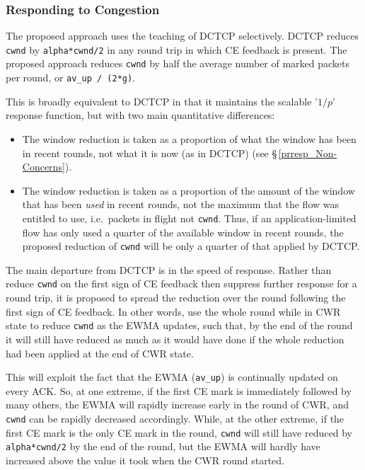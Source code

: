 \subsubsection{Responding to Congestion}\label{prresp_congestion_response}

The proposed approach uses the teaching of DCTCP selectively. DCTCP reduces \texttt{cwnd} by \texttt{alpha*cwnd/2} in any round trip in which CE feedback is present. The proposed approach reduces \texttt{cwnd} by half the average number of marked packets per round, or \texttt{av\_up / (2*g)}. 

This is broadly equivalent to DCTCP in that it maintains the scalable '\(1/p\)' response function, but with two main quantitative differences:
\begin{itemize}[nosep]
	\item The window reduction is taken as a proportion of what the window has been in recent rounds, not what it is now (as in DCTCP) (see \S\,\ref{prresp_Non-Concerns}).
	\item The window reduction is taken as a proportion of the amount of the window that has been \emph{used} in recent rounds, not the maximum that the flow was entitled to use, i.e.\ packets in flight not \texttt{cwnd}. Thus, if an application-limited flow has only used a quarter of the available window in recent rounds, the proposed reduction of \texttt{cwnd} will be only a quarter of that applied by DCTCP.
\end{itemize}

The main departure from DCTCP is in the speed of response. Rather than reduce  \texttt{cwnd} on the first sign of CE feedback then suppress further response for a round trip, it is proposed to spread the reduction over the round following the first sign of CE feedback. In other words, use the whole round while in CWR state to reduce \texttt{cwnd} as the EWMA updates, such that, by the end of the round it will still have reduced as much as it would have done if the whole reduction had been applied at the end of CWR state.

This will exploit the fact that the EWMA (\texttt{av\_up}) is continually updated on every ACK. So, at one extreme, if the first CE mark is immediately followed by many others, the EWMA will rapidly increase early in the round of CWR, and \texttt{cwnd} can be rapidly decreased accordingly. While, at the other extreme, if the first CE mark is the only CE mark in the round, \texttt{cwnd} will still have reduced by \texttt{alpha*cwnd/2} by the end of the round, but the EWMA will hardly have increased above the value it took when the CWR round started.

